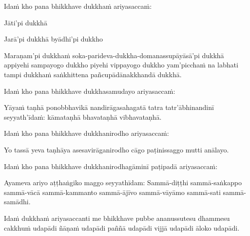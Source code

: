 \begin{pali-hang}
  Idaṁ kho pana bhikkhave dukkhaṁ ariyasaccaṁ:
\end{pali-hang}

\begin{pali-hang}
  Jāti'pi dukkhā
\end{pali-hang}

\begin{pali-hang}
  Jarā'pi dukkhā byādhi'pi dukkho
\end{pali-hang}

\begin{pali-hang}
  Maraṇam'pi dukkhaṁ soka-parideva-dukkha-domanassupāyāsā'pi dukkhā appiyehi sampayogo dukkho piyehi vippayogo dukkho yam'picchaṁ na labhati tampi dukkhaṁ saṅkhittena pañcupādānakkhandā dukkhā.
\end{pali-hang}

\begin{pali-hang}
  Idaṁ kho pana bhikkhave dukkhasamudayo ariyasaccaṁ:
\end{pali-hang}

\begin{pali-hang}
  Yāyaṁ taṇhā ponobbhavikā nandirāgasahagatā tatra tatr'ābhinandinī seyyath'īdaṁ: kāmataṇhā bhavataṇhā vibhavataṇhā.
\end{pali-hang}

\begin{pali-hang}
  Idaṁ kho pana bhikkhave dukkhanirodho ariyasaccaṁ:
\end{pali-hang}

\begin{pali-hang}
  Yo tassā yeva taṇhāya asesavirāganirodho cāgo paṭinissaggo mutti anālayo.
\end{pali-hang}

\begin{pali-hang}
  Idaṁ kho pana bhikkhave dukkhanirodhagāminī paṭipadā ariyasaccaṁ:
\end{pali-hang}

\begin{pali-hang}
  Ayameva ariyo aṭṭhaṅgiko maggo seyyathīdam: Sammā-diṭṭhi sammā-saṅkappo sammā-vācā sammā-kammanto sammā-ājīvo sammā-vāyāmo sammā-sati sammā-samādhi.
\end{pali-hang}

\begin{pali-hang}
  Idaṁ dukkhaṁ ariyasaccanti me bhikkhave pubbe ananussutesu dhammesu cakkhuṁ udapādi ñāṇaṁ udapādi paññā udapādi vijjā udapādi āloko udapādi.
\end{pali-hang}

